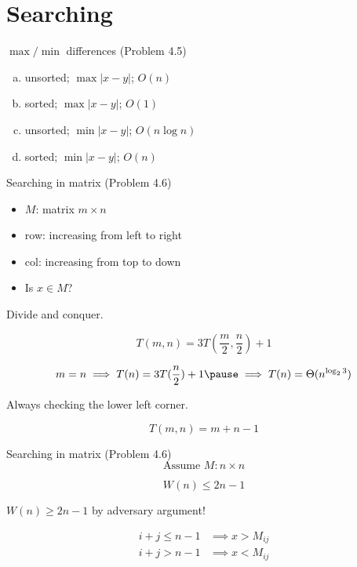 \section{Searching}

\begin{frame}{$\max/\min$ differences (Problem 4.5)}
  \begin{enumerate}[(a)]
	\item unsorted; $\max |x - y|$; $O(n)$
	\item sorted; $\max |x - y|$; $O(1)$
	\item unsorted; $\min |x - y|$; $O(n \log n)$
	\item sorted; $\min |x - y|$; $O(n)$
  \end{enumerate}
\end{frame}
\begin{frame}{Searching in matrix (Problem 4.6)}
  \begin{itemize}
	\item $M$: matrix $m \times n$
	\item row: increasing from left to right
	\item col: increasing from top to down
	\item Is $x \in M$?
  \end{itemize}

  \pause
  \centerline{Divide and conquer.}

  \pause
  \[
	T(m,n) = 3T(\frac{m}{2}, \frac{n}{2}) + 1 
  \]

  \pause
  \[
	m = n \implies T(n) = 3T(\frac{n}{2}) + 1 \pause \implies T(n) = \Theta(n^{\log_{2}3})
  \]

  \pause
  \centerline{Always checking the lower left corner.}

  \pause
  \[
	T(m, n) = m + n - 1
  \]
\end{frame}
\begin{frame}{Searching in matrix (Problem 4.6)}
  \[
	\text{Assume } M: n \times n 
  \]

  \[
	W(n) \le 2n - 1
  \]

  \pause
  \vspace{0.30cm}
  \centerline{$W(n) \ge 2n - 1$ by adversary argument!}

  \pause
  \begin{align*}
	i + j \le n - 1 &\implies x > M_{ij} \\
	i + j > n - 1 &\implies x < M_{ij} \\
  \end{align*}
\end{frame}
